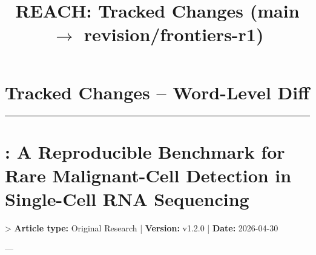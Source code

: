 \documentclass[11pt]{article}
\title{REACH: Tracked Changes (main \(\to\) revision/frontiers-r1)}
\author{}
\date{}
\begin{document}
\maketitle

\section*{Tracked Changes -- Word-Level Diff}
\noindent\rule{\textwidth}{0.4pt}

\section*{\REACH: A Reproducible Benchmark for Rare Malignant-Cell Detection in Single-Cell RNA Sequencing}
> \textbf{Article type:} Original Research | \textbf{Version:} v1.2.0 | \textbf{Date:} 2026-04-30

---
\end{document}
